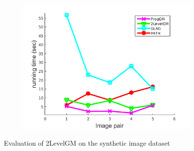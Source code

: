 \documentclass[hyperref={pdfpagelabels=false}]{beamer}
\begin{document}
\begin{frame}[allowframebreaks]
\begin{figure}[h]
\begin{subfigure}[b]{0.32\textwidth}
			\includegraphics[scale=0.15]{"fig/evaluation/ImageTrafo/anchor_descr/using_cpd_afftrafo/performance/time1"}
		\end{subfigure}
		\caption*{Evaluation of 2LevelGM on the synthetic image dataset}
\end{figure}

\framebreak


\end{frame}
\end{document}

